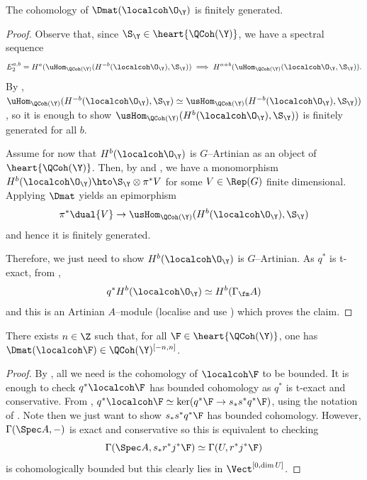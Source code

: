\documentclass{amsart}
\begin{document}
  \begin{lem}\label{lem:dloc_o_fg}
    The cohomology of \(\Dmat(\localcoh \O_\Y)\) is finitely generated.
  \end{lem}
  \begin{proof}
    Observe that, since \(\S_\Y \in \heart{\QCoh(\Y)}\),
    we have a spectral sequence
    \begin{displaymath}
      E_2^{a,b} = H^a(\uHom_{\QCoh(\Y)}(H^{-b}(\localcoh\O_\Y), \S_\Y))
      \implies H^{a+b}(\uHom_{\QCoh(\Y)}(\localcoh\O_\Y, \S_\Y)).
    \end{displaymath}
    By ,
    \(\uHom_{\QCoh(\Y)}(H^{-b}(\localcoh \O_\Y), \S_\Y)
    \simeq \usHom_{\QCoh(\Y)}(H^{-b}(\localcoh \O_\Y), \S_\Y))\),
    so it is enough to show \(\usHom_{\QCoh(\Y)}(H^{b}(\localcoh\O_\Y), \S_\Y))\)
    is finitely generated for all \(b\).

    Assume for now that \(H^b(\localcoh\O_\Y)\) is \(G\)--Artinian
    as an object of \(\heart{\QCoh(\Y)}\). Then, by 
    and , we have a monomorphism
    \(H^b(\localcoh \O_\Y) \hto \S_\Y \otimes \pi^\ast V\)
    for some \(V \in \Rep(G)\) finite dimensional. Applying
    \(\Dmat\) yields an epimorphism
    \begin{displaymath}
      \pi^\ast \dual{V} \to \usHom_{\QCoh(\Y)}(H^b(\localcoh \O_\Y),\S_\Y)
    \end{displaymath}
    and hence it is finitely generated.

    Therefore, we just need to show \(H^b(\localcoh \O_\Y)\)
    is \(G\)--Artinian. As \(q^\ast\) is t-exact, from ,
    \begin{displaymath}
      q^\ast H^b(\localcoh \O_\Y) \simeq H^b(\Gamma_\fm A)
    \end{displaymath}
    and this is an Artinian \(A\)--module (localise and 
    use \cite[Proposition 3.5.4]{bruns_herzog:1998}) which proves the claim.
  \end{proof}


  \begin{lem}\label{lem:fid}
    There exists \(n \in \Z\) such that, for all \(\F \in \heart{\QCoh(\Y)}\),
    one has \(\Dmat(\localcoh \F) \in \QCoh(\Y)^{[-n,n]}\).
  \end{lem}
  \begin{proof}
    By ,
    all we need is the cohomology
    of \(\localcoh \F\) to be bounded.
    It is enough to check \(q^\ast \localcoh \F\)
    has bounded cohomology as \(q^\ast\)
    is t-exact and conservative.
    From ,
    \(q^\ast \localcoh \F \simeq \ker(q^\ast \F \to s_\ast s^\ast q^\ast \F)\),
    using the notation of .
    Note then we just want to show \(s_\ast s^\ast q^\ast \F\)
    has bounded cohomology.
    However, \(\Gamma(\Spec A, -)\) is exact and conservative
    so this is equivalent to checking 
    \begin{displaymath}
      \Gamma(\Spec A, s_\ast r^\ast j^\ast \F) \simeq \Gamma(U, r^\ast j^\ast \F)
    \end{displaymath}
    is cohomologically bounded but this clearly lies in \(\Vect^{[0, \dim U]}\).
  \end{proof}
\end{document}
